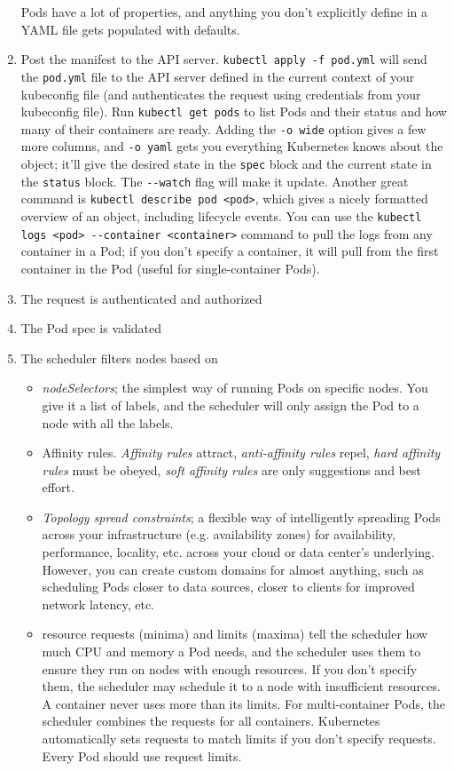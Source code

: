 \documentclass[8pt, table, xcdraw]{article}%
\begin{document}
\begin{enumerate}
	Pods have a lot of properties, and anything you don’t explicitly define in a YAML file gets populated with defaults.
    \item Post the manifest to the API server. \lstinline{kubectl apply -f pod.yml} will send the \lstinline{pod.yml} file to the API server defined in the current context of your kubeconfig file (and authenticates the request using credentials from your kubeconfig file). Run \lstinline{kubectl get pods} to list Pods and their status and how many of their containers are ready. Adding the \lstinline{-o wide} option gives a few more columns, and \lstinline{-o yaml} gets you everything Kubernetes knows about the object; it'll give the desired state in the \lstinline{spec} block and the current state in the \lstinline{status} block. The \lstinline{--watch} flag will make it update. Another great command is \lstinline{kubectl describe pod <pod>}, which gives a nicely formatted overview of an object, including lifecycle events. You can use the \lstinline{kubectl logs <pod> --container <container>} command to pull the logs from any container in a Pod; if you don't specify a container, it will pull from the first container in the Pod (useful for single-container Pods).
    \item The request is authenticated and authorized
    \item The Pod spec is validated
    \item The scheduler filters nodes based on
	\begin{itemize}
		\item \emph{nodeSelectors}; the simplest way of running Pods on specific nodes. You give it a list of labels, and the scheduler will only assign the Pod to a node with all the labels.
		\item Affinity rules. \emph{Affinity rules} attract, \emph{anti-affinity rules} repel, \emph{hard affinity rules} must be obeyed, \emph{soft affinity rules} are only suggestions and best effort.
		\item \emph{Topology spread constraints}; a flexible way of intelligently spreading Pods across your infrastructure (e.g. availability zones) for availability, performance, locality, etc. across your cloud or data center’s underlying. However, you can create custom domains for almost anything, such as scheduling Pods closer to data sources, closer to clients for improved network latency, etc.
		\item resource requests (minima) and limits (maxima) tell the scheduler how much CPU and memory a Pod needs, and the scheduler uses them to ensure they run on nodes with enough resources. If you don’t specify them, the scheduler may schedule it to a node with insufficient resources. A container never uses more than its limits. For multi-container Pods, the scheduler combines the requests for all containers. Kubernetes automatically sets requests to match limits if you don’t specify requests. Every Pod should use request limits.

\end{itemize}
\end{enumerate}
\end{document}
